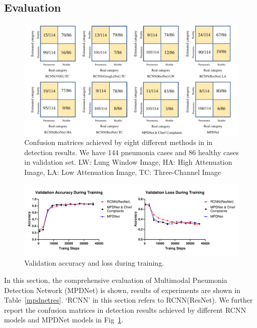 \documentclass[journal]{IEEEtran}
\begin{document}
\subsection{Evaluation}
\label{results}
\begin{figure}[htbp]
    \centerline{\includegraphics[width=160mm]{Confusionmatrices.pdf}}
    \vspace{-0cm}
    \caption{Confusion matrices achieved by eight different methods in in detection results. We have 144 pneumonia cases and 86 healthy cases in validation set. LW: Lung Window Image, HA: High Attenuation Image, LA: Low Attenuation Image, TC: Three-Channel Image}
    \vspace{-0cm}
    \label{Confusionmatrices}

    \end{figure}
\begin{figure}[htbp]
    \centerline{\includegraphics[width=180mm]{aacloss2.pdf}}
    \vspace{-0.5cm}
    \caption{Validation accuracy and loss during training.}
    \vspace{-0cm}
    \label{loss}

    \end{figure}


In this section, the comprehensive evaluation of Multimodal Pneumonia Detection Network (MPDNet) is shown, results of experiments are shown in Table~\ref{mpdnetres}. `RCNN' in this section refers to RCNN(ResNet). We further report the confusion matrices in detection results achieved by different RCNN models and MPDNet models in Fig~\ref{Confusionmatrices}.
\end{document}

